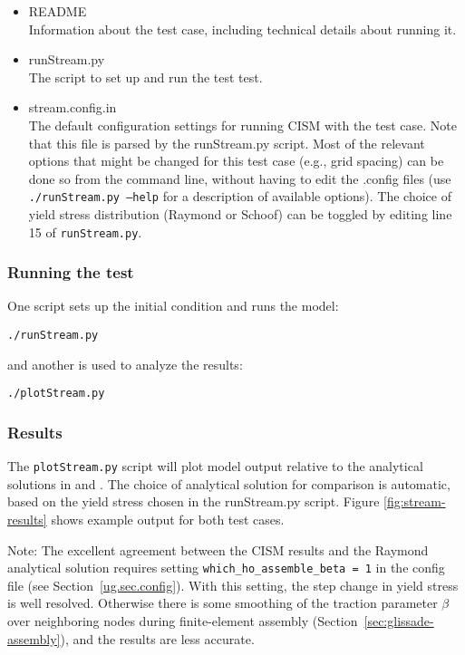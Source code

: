 \begin{itemize}
	\item README \\
		Information about the test case, including technical details about running it.
	\item runStream.py \\
		The script to set up and run the test test.
	\item stream.config.in \\
  The default configuration settings for running CISM with the test case. Note that this
  file is parsed by the runStream.py script. Most of the relevant options that might be changed
  for this test case (e.g., grid spacing) can be done so from the command line, without having to
  edit the .config files (use \texttt{./runStream.py --help} for a description of available options).
  The choice of yield stress distribution (Raymond or Schoof) can be toggled
  by editing line 15 of \texttt{runStream.py}.
\end{itemize}

\subsubsection{Running the test}
One script sets up the initial condition and runs the model:

\texttt{./runStream.py}

\noindent
and another is used to analyze the results:

\texttt{./plotStream.py}

\subsubsection{Results}
The \texttt{plotStream.py} script will plot model output relative to the analytical solutions
in \citet{Raymond2000} and \citet{Schoof2006}. The choice of analytical solution for comparison
is automatic, based on the yield stress chosen in the runStream.py script. 
Figure \ref{fig:stream-results} shows example output for both test cases.

Note: The excellent agreement between the CISM results and the Raymond analytical solution
requires setting \texttt{which\_ho\_assemble\_beta = 1} in the config file
(see Section~\ref{ug.sec.config}). With this setting, the step change in yield
stress is well resolved. Otherwise there is some smoothing of the traction 
parameter $\beta$ over neighboring nodes during finite-element assembly
(Section~\ref{sec:glissade-assembly}), and the results are less accurate.
 
